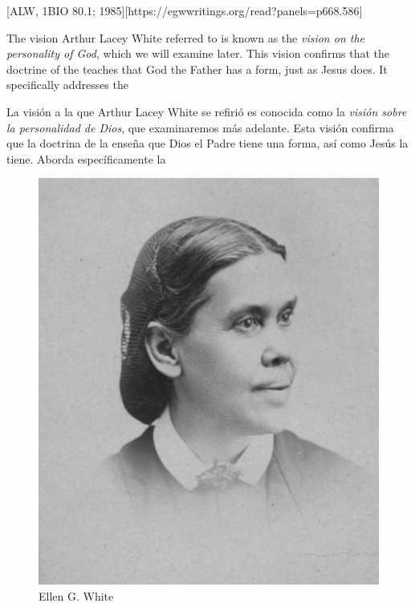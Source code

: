 [ALW, 1BIO 80.1; 1985][https://egwwritings.org/read?panels=p668.586]


The vision Arthur Lacey White referred to is known as the \textit{vision on the personality of God}, which we will examine later. This vision confirms that the doctrine of the  teaches that God the Father has a form, just as Jesus does. It specifically addresses the 


La visión a la que Arthur Lacey White se refirió es conocida como la \textit{visión sobre la personalidad de Dios}, que examinaremos más adelante. Esta visión confirma que la doctrina de la  enseña que Dios el Padre tiene una forma, así como Jesús la tiene. Aborda específicamente la 


\begin{figure}[t]
    \centering
    \includegraphics[width=0.65\linewidth]{images/ellen-white.jpg}
    \caption*{Ellen G. White}
    \label{fig:ellen-g-white}
\end{figure}


